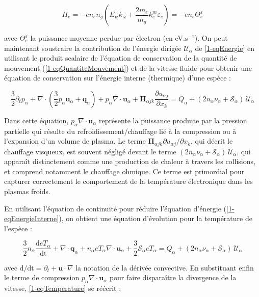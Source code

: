 \begin{refsection}
\begin{equation}
	\Pi_e=-en_en_g\left(E_\text{iz}k_\text{iz}+\frac{2m_e}{m_g}k^m_e\varepsilon_e\right)=-en_e\Theta_e^\varepsilon
\end{equation}

avec $\Theta_e^\varepsilon$ la puissance moyenne perdue par électron (en
eV.s$^{-1}$). On peut maintenant soustraire la contribution de l'énergie
dirigée $\mathcal{U}_{\alpha}$ de \eqref{1-eqEnergie} en utilisant le produit
scalaire de l'équation de conservation de la quantité de mouvement
(\eqref{1-eqQuantiteMouvement}) et de la vitesse fluide pour obtenir une
équation de conservation sur l'énergie interne (thermique) d'une espèce :

\begin{equation}
\label{1-eqEnergieInterne}
\frac{3}{2}\partial_t p_\alpha + 
\nabla\cdot\left(\frac{3}{2}p_\alpha
\mathbf{u}_\alpha+\mathbf q_\alpha\right)+p_\alpha\nabla\cdot\mathbf u_\alpha
+\boldsymbol{\Pi}_{\alpha j k}\frac{\partial u_{\alpha j}}{\partial{x_k}} =
{Q_\alpha}+(2n_\alpha\nu_\alpha+\mathcal{S}_\alpha)\,\mathcal{U}_\alpha
\end{equation}

Dans cette équation, $p_\alpha\nabla\cdot\mathbf u_\alpha$ représente la
puissance produite par la pression partielle qui résulte du
refroidissement/chauffage lié à la compression ou à l'expansion d'un volume de
plasma. Le terme $\boldsymbol{\Pi}_{\alpha j k}\partial u_{\alpha
j}/\partial{x_k}$, qui décrit le chauffage visqueux, est souvent négligé
devant le terme $(2n_\alpha\nu_\alpha+\mathcal{S}_\alpha)\,\mathcal{U}_\alpha$, 
qui apparaît distinctement comme une production de chaleur
à travers les collisions, et comprend notamment le chauffage ohmique. Ce
 terme est primordial pour capturer correctement le comportement de la
température électronique dans les plasmas froids.

En utilisant l'équation de
continuité pour réduire l'équation d'énergie (\eqref{1-eqEnergieInterne}), on
obtient une équation d'évolution pour la température de l'espèce :

\begin{equation}
\label{1-eqTemperature}
\frac{3}{2}n_\alpha\frac{\text{d}eT_\alpha}{\text{dt}}+\nabla\cdot\mathbf
q_\alpha + n_\alpha eT_\alpha\nabla\cdot\mathbf u_\alpha +
\frac{3}{2}\mathcal{S}_\alpha eT_\alpha =
{Q_\alpha}+(2n_\alpha\nu_\alpha+\mathcal{S}_\alpha)\,\mathcal{U}_\alpha
\end{equation}

avec $\text{d}/\text{dt}=\partial_t+\mathbf u\cdot\nabla$ la notation de la
dérivée convective. En substituant enfin le terme de compression
$p_\alpha\nabla\cdot\mathbf u_\alpha$ pour faire disparaître la divergence de la
vitesse, \eqref{1-eqTemperature} se réécrit :


\end{refsection}
